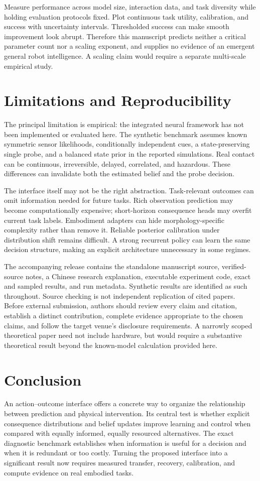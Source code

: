 \documentclass[11pt]{article}
\begin{document}
Measure performance across model size, interaction data, and task diversity while holding evaluation protocols fixed. Plot continuous task utility, calibration, and success with uncertainty intervals. Thresholded success can make smooth improvement look abrupt. Therefore this manuscript predicts neither a critical parameter count nor a scaling exponent, and supplies no evidence of an emergent general robot intelligence. A scaling claim would require a separate multi-scale empirical study.

\section{Limitations and Reproducibility}
The principal limitation is empirical: the integrated neural framework has not been implemented or evaluated here. The synthetic benchmark assumes known symmetric sensor likelihoods, conditionally independent cues, a state-preserving single probe, and a balanced state prior in the reported simulations. Real contact can be continuous, irreversible, delayed, correlated, and hazardous. These differences can invalidate both the estimated belief and the probe decision.

The interface itself may not be the right abstraction. Task-relevant outcomes can omit information needed for future tasks. Rich observation prediction may become computationally expensive; short-horizon consequence heads may overfit current task labels. Embodiment adapters can hide morphology-specific complexity rather than remove it. Reliable posterior calibration under distribution shift remains difficult. A strong recurrent policy can learn the same decision structure, making an explicit architecture unnecessary in some regimes.

The accompanying release contains the standalone manuscript source, verified-source notes, a Chinese research explanation, executable experiment code, exact and sampled results, and run metadata. Synthetic results are identified as such throughout. Source checking is not independent replication of cited papers. Before external submission, authors should review every claim and citation, establish a distinct contribution, complete evidence appropriate to the chosen claims, and follow the target venue's disclosure requirements. A narrowly scoped theoretical paper need not include hardware, but would require a substantive theoretical result beyond the known-model calculation provided here.

\section{Conclusion}
An action--outcome interface offers a concrete way to organize the relationship between prediction and physical intervention. Its central test is whether explicit consequence distributions and belief updates improve learning and control when compared with equally informed, equally resourced alternatives. The exact diagnostic benchmark establishes when information is useful for a decision and when it is redundant or too costly. Turning the proposed interface into a significant result now requires measured transfer, recovery, calibration, and compute evidence on real embodied tasks.
\end{document}
